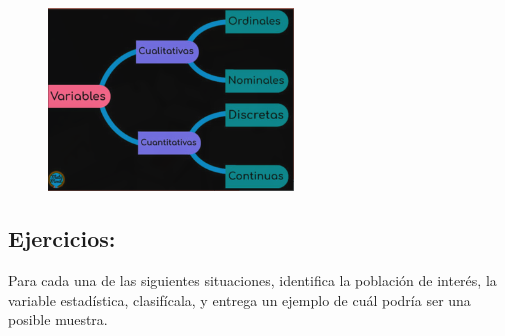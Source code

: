 \documentclass[12pt, letterpaper]{article}
\begin{document}
\begin{figure}[htbp]
	\centering
	\includegraphics[width=0.58\textwidth]{variables}
	\caption{}\label{fig:}
\end{figure}


\subsection{Ejercicios:}
Para cada una de las siguientes situaciones, identifica la población de interés, la variable estadística, clasifícala, y entrega un ejemplo de cuál podría ser una posible muestra.
\end{document}
